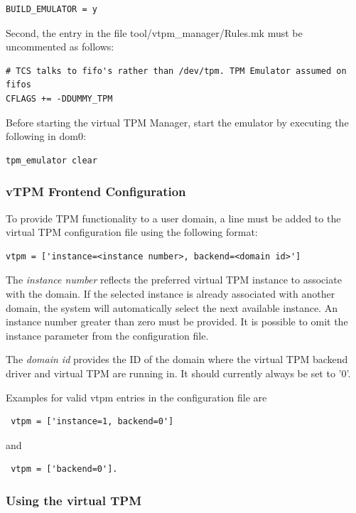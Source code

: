 \documentclass[11pt,twoside,final,openright]{report}
\begin{document}
\begin{verbatim}
BUILD_EMULATOR = y
\end{verbatim}

Second, the entry in the file tool/vtpm\_manager/Rules.mk must be uncommented
as follows:

\begin{verbatim}
# TCS talks to fifo's rather than /dev/tpm. TPM Emulator assumed on fifos
CFLAGS += -DDUMMY_TPM
\end{verbatim}

Before starting the virtual TPM Manager, start the emulator by executing
the following in dom0:

\begin{verbatim}
tpm_emulator clear
\end{verbatim}

\subsubsection{vTPM Frontend Configuration}
To provide TPM functionality to a user domain, a line must be added to
the virtual TPM configuration file using the following format:

\begin{verbatim}
vtpm = ['instance=<instance number>, backend=<domain id>']
\end{verbatim}

The { \it instance number} reflects the preferred virtual TPM instance
to associate with the domain. If the selected instance is
already associated with another domain, the system will automatically
select the next available instance. An instance number greater than
zero must be provided. It is possible to omit the instance
parameter from the configuration file.

The {\it domain id} provides the ID of the domain where the
virtual TPM backend driver and virtual TPM are running in. It should
currently always be set to '0'.


Examples for valid vtpm entries in the configuration file are

\begin{verbatim}
 vtpm = ['instance=1, backend=0']
\end{verbatim}
and
\begin{verbatim}
 vtpm = ['backend=0'].
\end{verbatim}

\subsubsection{Using the virtual TPM}
\end{document}
